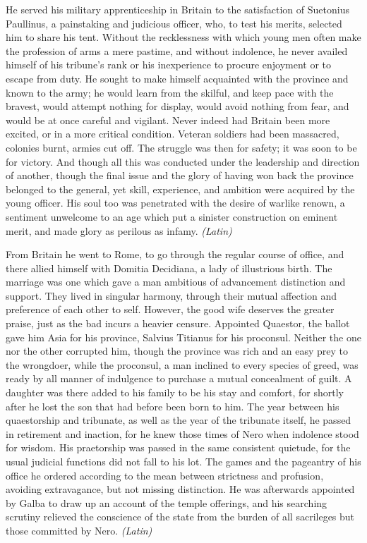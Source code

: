 
He served his military apprenticeship in Britain to the satisfaction of Suetonius Paullinus, a painstaking and judicious officer, who, to test his merits, selected him to share his tent. Without the recklessness with which young men often make the profession of arms a mere pastime, and without indolence, he never availed himself of his tribune's rank or his inexperience to procure enjoyment or to escape from duty. He sought to make himself acquainted with the province and known to the army; he would learn from the skilful, and keep pace with the bravest, would attempt nothing for display, would avoid nothing from fear, and would be at once careful and vigilant. Never indeed had Britain been more excited, or in a more critical condition. Veteran soldiers had been massacred, colonies burnt, armies cut off. The struggle was then for safety; it was soon to be for victory. And though all this was conducted under the leadership and direction of another, though the final issue and the glory of having won back the province belonged to the general, yet skill, experience, and ambition were acquired by the young officer. His soul too was penetrated with the desire of warlike renown, a sentiment unwelcome to an age which put a sinister construction on eminent merit, and made glory as perilous as infamy. \emph{(Latin)}


From Britain he went to Rome, to go through the regular course of office, and there allied himself with Domitia Decidiana, a lady of illustrious birth. The marriage was one which gave a man ambitious of advancement distinction and support. They lived in singular harmony, through their mutual affection and preference of each other to self. However, the good wife deserves the greater praise, just as the bad incurs a heavier censure. Appointed Quaestor, the ballot gave him Asia for his province, Salvius Titianus for his proconsul. Neither the one nor the other corrupted him, though the province was rich and an easy prey to the wrongdoer, while the proconsul, a man inclined to every species of greed, was ready by all manner of indulgence to purchase a mutual concealment of guilt. A daughter was there added to his family to be his stay and comfort, for shortly after he lost the son that had before been born to him. The year between his quaestorship and tribunate, as well as the year of the tribunate itself, he passed in retirement and inaction, for he knew those times of Nero when indolence stood for wisdom. His praetorship was passed in the same consistent quietude, for the usual judicial functions did not fall to his lot. The games and the pageantry of his office he ordered according to the mean between strictness and profusion, avoiding extravagance, but not missing distinction. He was afterwards appointed by Galba to draw up an account of the temple offerings, and his searching scrutiny relieved the conscience of the state from the burden of all sacrileges but those committed by Nero. \emph{(Latin)}

